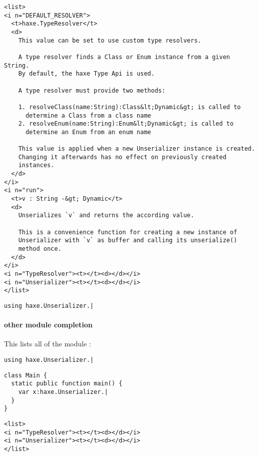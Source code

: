 \begin{lstlisting}
<list>
<i n="DEFAULT_RESOLVER">
  <t>haxe.TypeResolver</t>
  <d>
    This value can be set to use custom type resolvers.

    A type resolver finds a Class or Enum instance from a given String.
    By default, the haxe Type Api is used.

    A type resolver must provide two methods:

    1. resolveClass(name:String):Class&lt;Dynamic&gt; is called to
      determine a Class from a class name
    2. resolveEnum(name:String):Enum&lt;Dynamic&gt; is called to
      determine an Enum from an enum name

    This value is applied when a new Unserializer instance is created.
    Changing it afterwards has no effect on previously created
    instances.
  </d>
</i>
<i n="run">
  <t>v : String -&gt; Dynamic</t>
  <d>
    Unserializes `v` and returns the according value.

    This is a convenience function for creating a new instance of
    Unserializer with `v` as buffer and calling its unserialize()
    method once.
  </d>
</i>
<i n="TypeResolver"><t></t><d></d></i>
<i n="Unserializer"><t></t><d></d></i>
</list>
\end{lstlisting}


\begin{lstlisting}
using haxe.Unserializer.|
\end{lstlisting}


\paragraph{other module completion}

This lists all  of the module :

\begin{lstlisting}
using haxe.Unserializer.|
\end{lstlisting}

\begin{lstlisting}
class Main {
  static public function main() {
    var x:haxe.Unserializer.|
  }
}
\end{lstlisting}

\begin{lstlisting}
<list>
<i n="TypeResolver"><t></t><d></d></i>
<i n="Unserializer"><t></t><d></d></i>
</list>
\end{lstlisting}


